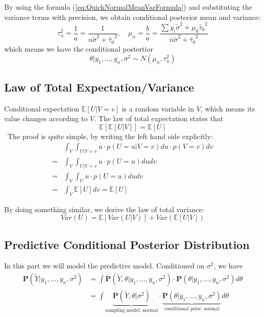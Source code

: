 By using the formula (\ref{eq:QuickNormalMeanVarFormula}) and substituting the variance terms with precision, we obtain conditional posterior mean and variance:
\begin{equation*}
    \tau_n^2 = \frac{1}{a} = \frac{1}{n\tilde{\sigma}^2 + \tilde{\tau_0}^2}, \quad \mu_n = \frac{b}{a} = \frac{\sum y_i \tilde{\sigma}^2 + \mu_0\tilde{\tau_0}^2}{n\tilde{\sigma}^2 + \tilde{\tau_0}^2}
\end{equation*}
which means we have the conditional postertior
\begin{equation*}
    \theta | y_1, \ldots, y_n, \sigma^2 \sim N(\mu_n, \tau_n^2)
\end{equation*}

\subsection{Law of Total Expectation/Variance}
Conditional expectation $\mathbb{E}[U|V=v]$ is a random variable in $V$, which means its value changes according to $V$. The law of total expectation states that 
\begin{equation*}
    \mathbb{E}[\mathbb{E}[U|V]] = \mathbb{E}[U]
\end{equation*}\
The proof is quite simple, by writing the left hand side explicitly:
\begin{align*}
    &\int_{V}\int_{U|V=v}u \cdot p(U=u|V=v) du \cdot p(V=v)dv \\
    =& \int_{V}\int_{U|V=v}u \cdot p(U=u) dudv \\
    =& \int_{V}\int_{U}u \cdot p(U=u) dudv \\
    =& \int_{V} \mathbb{E}[U] dv = \mathbb{E}[U]
\end{align*}

By doing something similar, we derive the law of total variance:
\begin{equation*}
    Var(U) = \mathbb{E}[Var(U|V)] + Var(\mathbb{E}[U|V])
\end{equation*}

\subsection{Predictive Conditional Posterior Distribution}
In this part we will model the predictive model. Conditioned on $\sigma^2$, we have
\begin{align*}
    \mathbf{P}(\tilde{Y} | y_1, \ldots, y_n, \sigma^2) &= \int \mathbf{P}(\tilde{Y},\theta | y_1, \ldots, y_n, \sigma^2) \cdot \mathbf{P}(\theta | y_1, \ldots, y_n, \sigma^2) d\theta \\
    &= \int \underbrace{\mathbf{P}(\tilde{Y},\theta | \sigma^2)}_{\text{sampling model: normal}} \cdot \underbrace{\mathbf{P}(\theta | y_1, \ldots, y_n, \sigma^2)}_{\text{conditional prior: normal}} d\theta
\end{align*}

